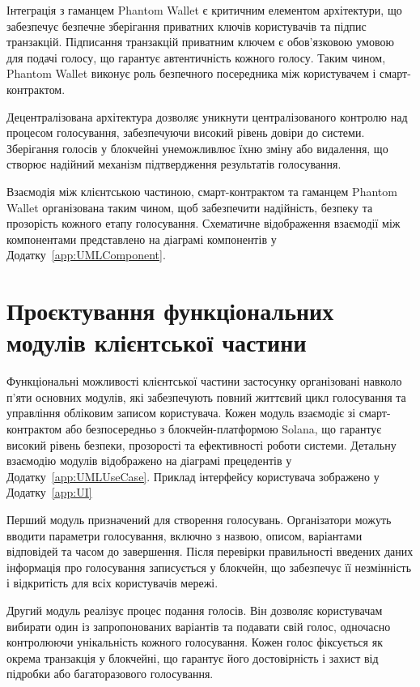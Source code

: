 \documentclass[14pt]{extreport}
\begin{document}
  Інтеграція з гаманцем Phantom Wallet є критичним елементом архітектури, що забезпечує безпечне зберігання приватних ключів користувачів та підпис транзакцій. Підписання транзакцій приватним ключем є обов'язковою умовою для подачі голосу, що гарантує автентичність кожного голосу. Таким чином, Phantom Wallet виконує роль безпечного посередника між користувачем і смарт-контрактом.

  Децентралізована архітектура дозволяє уникнути централізованого контролю над процесом голосування, забезпечуючи високий рівень довіри до системи. Зберігання голосів у блокчейні унеможливлює їхню зміну або видалення, що створює надійний механізм підтвердження результатів голосування.

  Взаємодія між клієнтською частиною, смарт-контрактом та гаманцем Phantom Wallet організована таким чином, щоб забезпечити надійність, безпеку та прозорість кожного етапу голосування. Схематичне відображення взаємодії між компонентами представлено на діаграмі компонентів у Додатку~\ref{app:UMLComponent}.
  
  \section{Проєктування функціональних модулів клієнтської частини}
  
  Функціональні можливості клієнтської частини застосунку організовані навколо п'яти основних модулів, які забезпечують повний життєвий цикл голосування та управління обліковим записом користувача. Кожен модуль взаємодіє зі смарт-контрактом або безпосередньо з блокчейн-платформою Solana, що гарантує високий рівень безпеки, прозорості та ефективності роботи системи. Детальну взаємодію модулів відображено на діаграмі прецедентів у Додатку~\ref{app:UMLUseCase}. Приклад інтерфейсу користувача зображено у Додатку~\ref{app:UI}

  Перший модуль призначений для створення голосувань. Організатори можуть вводити параметри голосування, включно з назвою, описом, варіантами відповідей та часом до завершення. Після перевірки правильності введених даних інформація про голосування записується у блокчейн, що забезпечує її незмінність і відкритість для всіх користувачів мережі.

  Другий модуль реалізує процес подання голосів. Він дозволяє користувачам вибирати один із запропонованих варіантів та подавати свій голос, одночасно контролюючи унікальність кожного голосування. Кожен голос фіксується як окрема транзакція у блокчейні, що гарантує його достовірність і захист від підробки або багаторазового голосування.
\end{document}
